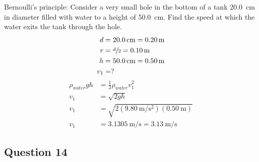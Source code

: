 \documentclass{article}
\begin{document}
Bernoulli's principle: Consider a very small hole in the bottom of a tank \SI{20.0}{\centi \meter} in diameter filled with water to a height of \SI{50.0}{\centi \meter}. Find the speed at which the water exits the tank through the hole.
\begin{align*}
	d & = \SI{20.0}{\centi \meter} = \SI{0.20}{\meter} \\
	r & = \sfrac{ d }{ 2 } = \SI{0.10}{\meter} \\
	h & = \SI{50.0}{\centi \meter} = \SI{0.50}{\meter} \\
	v_1 & = ?
\end{align*}
\begin{align*}
	\rho_{water}gh & = \frac{1}{2}\rho_{water}v_1^2 \\
	v_1 & = \sqrt{ 2gh } \\
	v_1 & = \sqrt{ 2(\SI{9.80}{\meter \per \second \squared})(\SI{0.50}{\meter}) } \\
	v_1 & = \SI{3.1305}{\meter \per \second} = \SI{3.13}{\meter \per \second}
\end{align*}

\subsection{Question 14}
\end{document}
